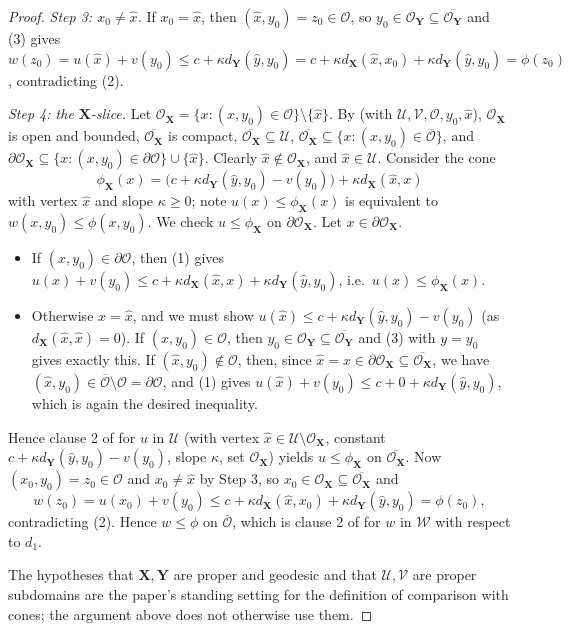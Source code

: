 \begin{proof}
\emph{Step 3: $x_0\ne\hat x$.} If $x_0=\hat x$, then $(\hat x,y_0)=z_0\in\mathcal O$, so $y_0\in\mathcal O_{\mathbf Y}\subseteq\overline{\mathcal O_{\mathbf Y}}$ and (3) gives $w(z_0)=u(\hat x)+v(y_0)\le c+\kappa d_{\mathbf Y}(\hat y,y_0)=c+\kappa d_{\mathbf X}(\hat x,x_0)+\kappa d_{\mathbf Y}(\hat y,y_0)=\phi(z_0)$, contradicting (2).

\emph{Step 4: the $\mathbf X$-slice.} Let $\mathcal O_{\mathbf X}=\{x:(x,y_0)\in\mathcal O\}\setminus\{\hat x\}$. By  (with $\mathcal U,\mathcal V,\mathcal O,y_0,\hat x$), $\mathcal O_{\mathbf X}$ is open and bounded, $\overline{\mathcal O_{\mathbf X}}$ is compact, $\overline{\mathcal O_{\mathbf X}}\subseteq\mathcal U$, $\overline{\mathcal O_{\mathbf X}}\subseteq\{x:(x,y_0)\in\overline{\mathcal O}\}$, and $\partial\mathcal O_{\mathbf X}\subseteq\{x:(x,y_0)\in\partial\mathcal O\}\cup\{\hat x\}$. Clearly $\hat x\notin\mathcal O_{\mathbf X}$, and $\hat x\in\mathcal U$. Consider the cone
\[
\phi_{\mathbf X}(x)=\bigl(c+\kappa d_{\mathbf Y}(\hat y,y_0)-v(y_0)\bigr)+\kappa d_{\mathbf X}(\hat x,x)
\]
with vertex $\hat x$ and slope $\kappa\ge0$; note $u(x)\le\phi_{\mathbf X}(x)$ is equivalent to $w(x,y_0)\le\phi(x,y_0)$. We check $u\le\phi_{\mathbf X}$ on $\partial\mathcal O_{\mathbf X}$. Let $x\in\partial\mathcal O_{\mathbf X}$.
\begin{itemize}
\item If $(x,y_0)\in\partial\mathcal O$, then (1) gives $u(x)+v(y_0)\le c+\kappa d_{\mathbf X}(\hat x,x)+\kappa d_{\mathbf Y}(\hat y,y_0)$, i.e.\ $u(x)\le\phi_{\mathbf X}(x)$.
\item Otherwise $x=\hat x$, and we must show $u(\hat x)\le c+\kappa d_{\mathbf Y}(\hat y,y_0)-v(y_0)$ (as $d_{\mathbf X}(\hat x,\hat x)=0$). If $(\hat x,y_0)\in\mathcal O$, then $y_0\in\mathcal O_{\mathbf Y}\subseteq\overline{\mathcal O_{\mathbf Y}}$ and (3) with $y=y_0$ gives exactly this. If $(\hat x,y_0)\notin\mathcal O$, then, since $\hat x=x\in\partial\mathcal O_{\mathbf X}\subseteq\overline{\mathcal O_{\mathbf X}}$, we have $(\hat x,y_0)\in\overline{\mathcal O}\setminus\mathcal O=\partial\mathcal O$, and (1) gives $u(\hat x)+v(y_0)\le c+0+\kappa d_{\mathbf Y}(\hat y,y_0)$, which is again the desired inequality.
\end{itemize}
Hence clause 2 of  for $u$ in $\mathcal U$ (with vertex $\hat x\in\mathcal U\setminus\mathcal O_{\mathbf X}$, constant $c+\kappa d_{\mathbf Y}(\hat y,y_0)-v(y_0)$, slope $\kappa$, set $\mathcal O_{\mathbf X}$) yields $u\le\phi_{\mathbf X}$ on $\overline{\mathcal O_{\mathbf X}}$. Now $(x_0,y_0)=z_0\in\mathcal O$ and $x_0\ne\hat x$ by Step 3, so $x_0\in\mathcal O_{\mathbf X}\subseteq\overline{\mathcal O_{\mathbf X}}$ and
\[
w(z_0)=u(x_0)+v(y_0)\le c+\kappa d_{\mathbf X}(\hat x,x_0)+\kappa d_{\mathbf Y}(\hat y,y_0)=\phi(z_0),
\]
contradicting (2). Hence $w\le\phi$ on $\overline{\mathcal O}$, which is clause 2 of  for $w$ in $\mathcal W$ with respect to $d_1$.

The hypotheses that $\mathbf X,\mathbf Y$ are proper and geodesic and that $\mathcal U,\mathcal V$ are proper subdomains are the paper's standing setting for the definition of comparison with cones; the argument above does not otherwise use them.
\end{proof}
